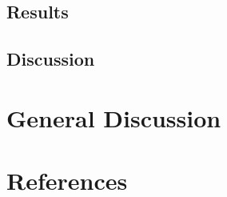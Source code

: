 \documentclass[
  english,
  man]{apa6}
\begin{document}
\hypertarget{results}{%
\subsection{Results}\label{results}}

\hypertarget{discussion}{%
\subsection{Discussion}\label{discussion}}

\hypertarget{general-discussion}{%
\section{General Discussion}\label{general-discussion}}

\newpage

\hypertarget{references}{%
\section{References}\label{references}}

\begingroup
\setlength{\parindent}{-0.5in}
\setlength{\leftskip}{0.5in}
\end{document}
